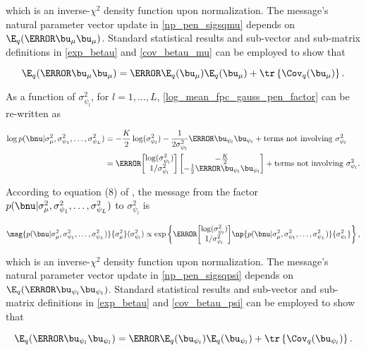 \documentclass[12pt]{article}
\theoremstyle{plain}
\theoremstyle{definition}
\theoremstyle{remark}
\def\sigsqmu{\sigma^2_{\mu}}
\def\umu{\bu_\mu}
\newcommand\upsi[1]{\bu_{\psi_{#1}}}
\newcommand\sigsqpsi[1]{\sigma^2_{\psi_{#1}}}
\newcommand\tni[1]{\text{terms not involving $#1$}}
\begin{document}
\noindent which is an inverse-$\chi^2$
density function upon normalization. The message's natural parameter vector update in \eqref{np_pen_sigsqmu}
depends on $\E_q (\T{\umu} \umu)$. Standard statistical results and sub-vector and sub-matrix definitions in
\eqref{exp_betau} and \eqref{cov_betau_mu} can be employed to show that

\[
	\E_q (\T{\umu} \umu) = \T{\E_q (\umu)} \E_q (\umu) + \tr \left\{ \Cov_q (\umu) \right\}.
\]

As a function of $\sigsqpsi{l}$, for $l = 1, \dots, L$, \eqref{log_mean_fpc_gauss_pen_factor} can be re-written as

\begin{align*}
	\log p(\bnu | \sigsqmu, \sigsqpsi{1}, \dots, \sigsqpsi{L})
		& = -\frac{K}{2} \log (\sigsqpsi{l}) - \frac{1}{2\sigsqpsi{l}} \T{\upsi{l}} \upsi{l} + \tni{\sigsqpsi{l}} \\
		& = \T{\begin{bmatrix}
			\log (\sigsqpsi{l}) \\
			1/\sigsqpsi{l}
		\end{bmatrix}} \begin{bmatrix}
			-\frac{K}{2} \\
			-\frac12 \T{\upsi{l}} \upsi{l}
		\end{bmatrix} + \tni{\sigsqpsi{l}}.
\end{align*}

\noindent According to equation (8) of \citet{wand17}, the message from the factor $p(\bnu | \sigsqmu, \sigsqpsi{1}, \dots,
\sigsqpsi{L})$ to $\sigsqpsi{l}$ is

\[
	\msg{p (\bnu | \sigsqmu, \sigsqpsi{1}, \dots, \sigsqpsi{L})}{\sigsqmu} (\sigsqpsi{l})
		\propto
			\exp \left\{
				\T{\begin{bmatrix}
					\log (\sigsqpsi{l}) \\
					1/\sigsqpsi{l}
				\end{bmatrix}} 
				\np{p (\bnu | \sigsqmu, \sigsqpsi{1}, \dots, \sigsqpsi{L})}{\sigsqpsi{l}}
			\right\},
\]

\noindent which is an inverse-$\chi^2$
density function upon normalization. The message's natural parameter vector update in \eqref{np_pen_sigsqpsi}
depends on $\E_q (\T{\upsi{l}} \upsi{l})$. Standard statistical results and sub-vector and sub-matrix definitions in
\eqref{exp_betau} and \eqref{cov_betau_psi} can be employed to show that

\[
	\E_q (\T{\upsi{l}} \upsi{l}) = \T{\E_q (\upsi{l})} \E_q (\upsi{l}) + \tr \left\{ \Cov_q (\upsi{l}) \right\}.
\]
\end{document}
